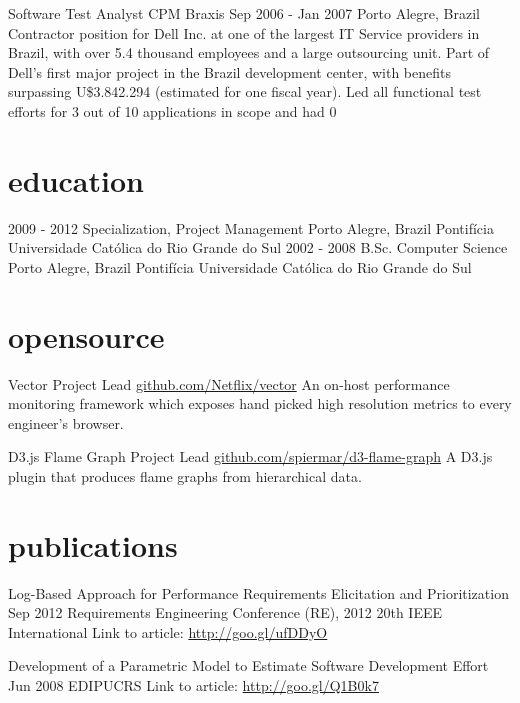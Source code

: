 \documentclass[]{mspier-cv}
\begin{document}
\experienceitem
  {Software Test Analyst}
  {CPM Braxis}
  {Sep 2006 - Jan 2007}
  {Porto Alegre, Brazil}
  {
    Contractor position for Dell Inc. at one of the largest IT Service providers in Brazil, with over 5.4 thousand employees and a large outsourcing unit.
    Part of Dell’s first major project in the Brazil development center, with benefits surpassing U\$3.842.294 (estimated for one fiscal year).
    Led all functional test efforts for 3 out of 10 applications in scope and had 0%
  }

\section{education}

\begin{entrylist}
  \entry
    {2009 - 2012}
    {Specialization, Project Management}
    {Porto Alegre, Brazil}
    {Pontifícia Universidade Católica do Rio Grande do Sul}
  \entry
    {2002 - 2008}
    {B.Sc. Computer Science}
    {Porto Alegre, Brazil}
    {Pontifícia Universidade Católica do Rio Grande do Sul}
\end{entrylist}

\section{opensource}

\opensourceitem
  {Vector}
  {Project Lead}
  {\href{https://github.com/Netflix/vector}{github.com/Netflix/vector}}
  {An on-host performance monitoring framework which exposes hand picked high resolution metrics to every engineer’s browser.}

\opensourceitem
  {D3.js Flame Graph}
  {Project Lead}
  {\href{https://github.com/spiermar/d3-flame-graph}{github.com/spiermar/d3-flame-graph}}
  {A D3.js plugin that produces flame graphs from hierarchical data.}

\section{publications}

\publicationitem
  {Log-Based Approach for Performance Requirements Elicitation and Prioritization}
  {Sep 2012}
  {Requirements Engineering Conference (RE), 2012 20th IEEE International}
  {Link to article: \url{http://goo.gl/ufDDyO}}

\publicationitem
  {Development of a Parametric Model to Estimate Software Development Effort}
  {Jun 2008}
  {EDIPUCRS}
  {Link to article: \url{http://goo.gl/Q1B0k7}}
\end{document}
